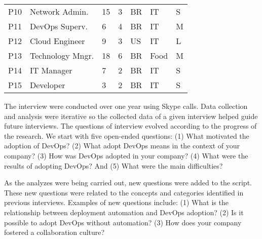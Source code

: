 \begin{table}[t]
\begin{tabular}{|p{0.4cm}|p{2.6cm}|p{0.4cm}|p{0.45cm}|p{0.5cm}|p{1.3cm}|p{0.3cm}|}
P10                  & Network Admin.        & 15           & 3           & BR            & IT                 & S                               \\ \centering

P11                  & DevOps Superv.                & 6            & 4           & BR            & IT                  & M                               \\ \centering

P12                  & Cloud Engineer              & 9            & 3           & US            & IT                  & L                               \\ \centering

P13                  & Technology Mngr.                 & 18            & 6           & BR            & Food                  & M                               \\ \centering

P14                  & IT Manager            & 7            & 2           & BR            & IT                  & S                               \\ \centering

P15                  & Developer        & 3            & 2           & BR            & IT                  & S \\ \bottomrule
\end{tabular}
\end{table}



The interview were conducted over one year using Skype calls.
Data collection and analysis were iterative so the collected data of a given interview helped guide
future interviews. The questions of interview evolved according to
the progress of the research. We start with five open-ended questions: (1) What
motivated the adoption of DevOps? (2) What adopt DevOps means in the context of
your company? (3) How was DevOps adopted in your company? (4) What were the
results of adopting DevOps? And (5) What were the main difficulties?

As the analyzes were being carried out, new questions were added to the script.
These new questions were related to the concepts and categories identified in
previous interviews. Examples of new questions include: (1) What is the
relationship between deployment automation and DevOps adoption? (2) Is it
possible to adopt DevOps without automation? (3) How does your company fostered a collaboration
culture?

